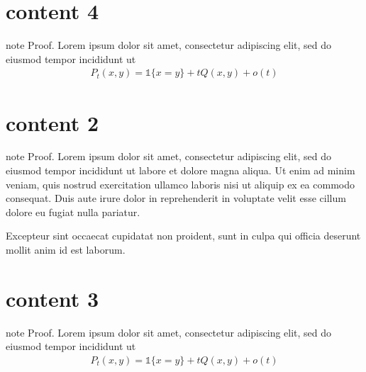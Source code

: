 \sphinxstepscope


\chapter{content 4}
\label{\detokenize{proof/_proof_with_labeled_math:content-4}}\label{\detokenize{proof/_proof_with_labeled_math::doc}}
\begin{sphinxadmonition}{note}
\sphinxAtStartPar
Proof. Lorem ipsum dolor sit amet, consectetur adipiscing elit, sed do eiusmod tempor incididunt ut
\begin{equation}\label{equation:proof/_proof_with_labeled_math:label1}
\begin{split}P_t(x, y) = \mathbb 1\{x = y\} + t Q(x, y) + o(t)\end{split}
\end{equation}\end{sphinxadmonition}

\sphinxstepscope


\chapter{content 2}
\label{\detokenize{proof/_proof_no_classname:content-2}}\label{\detokenize{proof/_proof_no_classname::doc}}
\begin{sphinxadmonition}{note}
\sphinxAtStartPar
Proof. Lorem ipsum dolor sit amet, consectetur adipiscing elit, sed do eiusmod tempor incididunt ut labore et dolore magna aliqua.
Ut enim ad minim veniam, quis nostrud exercitation ullamco laboris nisi ut aliquip ex ea commodo consequat. Duis aute irure dolor in reprehenderit in voluptate velit esse cillum dolore eu fugiat nulla pariatur.

\sphinxAtStartPar
Excepteur sint occaecat cupidatat non proident, sunt in culpa qui officia deserunt mollit anim id est laborum.
\end{sphinxadmonition}

\sphinxstepscope


\chapter{content 3}
\label{\detokenize{proof/_proof_with_unlabeled_math:content-3}}\label{\detokenize{proof/_proof_with_unlabeled_math::doc}}
\begin{sphinxadmonition}{note}
\sphinxAtStartPar
Proof. Lorem ipsum dolor sit amet, consectetur adipiscing elit, sed do eiusmod tempor incididunt ut
\begin{equation*}
\begin{split}P_t(x, y) = \mathbb 1\{x = y\} + t Q(x, y) + o(t)\end{split}
\end{equation*}\end{sphinxadmonition}

